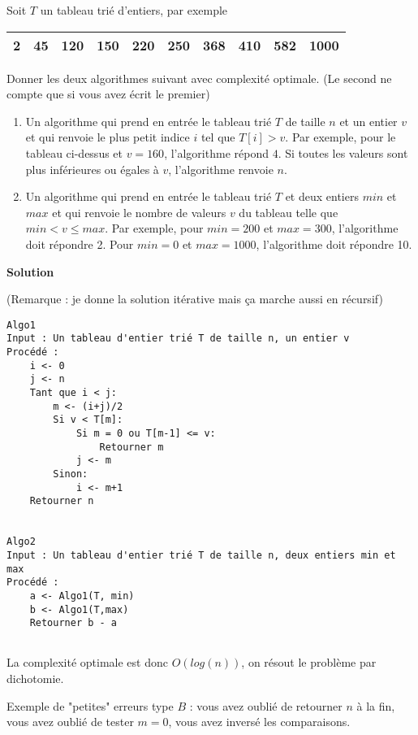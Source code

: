 
\begin{exercice}
Soit $T$ un tableau trié d'entiers, par exemple

\begin{tabular}{|c|c|c|c|c|c|c|c|c|c|}
\hline
2 & 45 & 120 & 150 & 220 & 250 & 368 & 410 & 582 & 1000 \\
\hline
\end{tabular}

\vspace{0.5cm}

Donner les deux algorithmes suivant avec complexité optimale. (Le second ne compte que si vous avez écrit le premier)

\begin{enumerate}
\item Un algorithme qui prend en entrée le tableau trié $T$ de taille $n$ et un entier $v$ et qui renvoie le plus petit indice $i$ tel que $T[i] > v$. Par exemple, pour le tableau ci-dessus et $v = 160$, l'algorithme répond $4$. Si toutes les valeurs sont plus inférieures ou égales à $v$, l'algorithme renvoie $n$.

\item Un algorithme qui prend en entrée le tableau trié $T$ et deux entiers $min$ et $max$ et qui renvoie le nombre de valeurs $v$ du tableau telle que $min < v \leq max$. Par exemple, pour $min = 200$ et $max = 300$, l'algorithme doit répondre 2. Pour $min = 0$ et $max = 1000$, l'algorithme doit répondre 10. 
\end{enumerate}

\textbf{Solution}

(Remarque : je donne la solution itérative mais ça marche aussi en récursif)

\begin{lstlisting}
Algo1
Input : Un tableau d'entier trié T de taille n, un entier v
Procédé :
    i <- 0
    j <- n
    Tant que i < j:
        m <- (i+j)/2
        Si v < T[m]:
            Si m = 0 ou T[m-1] <= v:
                Retourner m
            j <- m
        Sinon:
            i <- m+1
    Retourner n 
            

Algo2
Input : Un tableau d'entier trié T de taille n, deux entiers min et max
Procédé :
    a <- Algo1(T, min)
    b <- Algo1(T,max)
    Retourner b - a
    
\end{lstlisting}

La complexité optimale est donc $O(log(n))$, on résout le problème par dichotomie.

Exemple de "petites" erreurs type $B$ : vous avez oublié de retourner $n$ à la fin, vous avez oublié de tester $m=0$, vous avez inversé les comparaisons.

\end{exercice}
